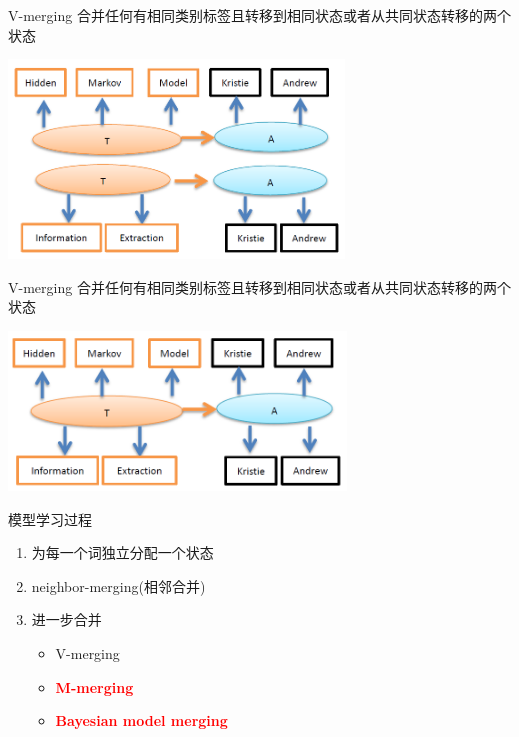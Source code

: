 \documentclass{beamer}
\begin{document}
\begin{frame}{V-merging}
    合并任何有相同类别标签且转移到相同状态或者从共同状态转移的两个状态
    \begin{center}
        \includegraphics[height=150pt]{report5/v-merge-1.png}
    \end{center}
\end{frame}

\begin{frame}{V-merging}
    合并任何有相同类别标签且转移到相同状态或者从共同状态转移的两个状态
    \begin{center}
        \includegraphics[height=120pt]{report5/v-merge-2.png}
    \end{center}
\end{frame}

\begin{frame}{模型学习过程}
    \begin{enumerate}
        \item 为每一个词独立分配一个状态
        \item neighbor-merging(相邻合并)
        \item 进一步合并
            \begin{itemize}
                \item V-merging
                \item \textbf{\textcolor{red}{M-merging}}
                \item \textbf{\textcolor{red}{Bayesian model merging}}
            \end{itemize}
    \end{enumerate}
\end{frame}
\end{document}
